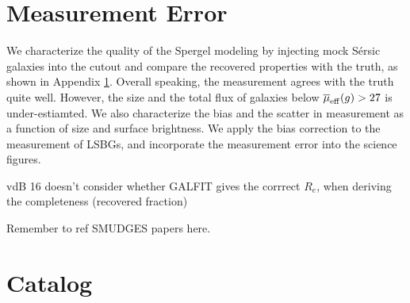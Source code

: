 \documentclass[twocolumn,astrosymb,twocolappendix]{aastex631}
\newcommand{\sersic}{S\'ersic}
\begin{document}
\begin{CJK*}{UTF8}{gbsn}
\section{Measurement Error}\label{ap:meas_error}

We characterize the quality of the Spergel modeling by injecting mock \sersic{} galaxies into the cutout and compare the recovered properties with the truth, as shown in Appendix \ref{ap:meas_error}. Overall speaking, the measurement agrees with the truth quite well. However, the size and the total flux of galaxies below $\overline{\mu}_{\rm eff} (g) > 27$ is under-estiamted. We also characterize the bias and the scatter in measurement as a function of size and surface brightness. We apply the bias correction to the measurement of LSBGs, and incorporate the measurement error into the science figures. 



vdB 16 doesn't consider whether GALFIT gives the corrrect $R_e$, when deriving the completeness (recovered fraction)

Remember to ref SMUDGES papers here.


\section{Catalog}
\onecolumngrid 


\end{CJK*}
\end{document}
